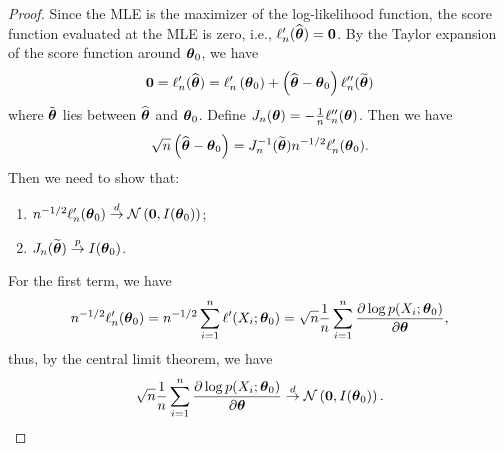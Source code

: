 \begin{proof}
	Since the MLE is the maximizer of the log-likelihood function, the score function evaluated at the MLE is zero, i.e., \(\ell_{n}^{\prime}(\widehat{\boldsymbol{\theta}})=\mathbf{0}\). By the Taylor expansion of the score function around \(\boldsymbol{\theta}_{0}\), we have
	\begin{equation*}
		\mathbf{0}=\ell_{n}^{\prime}(\widehat{\boldsymbol{\theta}})=\ell_{n}^{\prime}\left(\boldsymbol{\theta}_{0}\right)+\left(\widehat{\boldsymbol{\theta}}-\boldsymbol{\theta}_{0}\right)\ell_{n}^{\prime\prime}(\widetilde{\boldsymbol{\theta}})
	\end{equation*}
	where \(\tilde{\boldsymbol{\theta}}\) lies between \(\widehat{\boldsymbol{\theta}}\) and \(\boldsymbol{\theta}_{0}\). Define \(J_{n}(\boldsymbol{\theta})=-\frac{1}{n}\ell_{n}^{\prime\prime}(\boldsymbol{\theta})\). Then we have
	\begin{equation*}
		\sqrt{n}\left(\widehat{\boldsymbol{\theta}}-\boldsymbol{\theta}_{0}\right)=J_{n}^{-1}(\widetilde{\boldsymbol{\theta}})n^{-1/2}\ell_{n}^{\prime}(\boldsymbol{\theta}_{0}).
	\end{equation*}
	Then we need to show that:
	\begin{enumerate}
		\item \(n^{-1/2}\ell_{n}^{\prime}(\boldsymbol{\theta}_{0})\stackrel{d}{\rightarrow}\mathcal{N}\left(\mathbf{0}, I(\boldsymbol{\theta}_{0})\right)\);
		\item \(J_{n}(\widetilde{\boldsymbol{\theta}})\stackrel{p}{\rightarrow}I(\boldsymbol{\theta}_{0})\).
	\end{enumerate}

	For the first term, we have
	\begin{equation*}
		n^{-1/2}\ell_{n}^{\prime}(\boldsymbol{\theta}_{0})=n^{-1/2}\sum_{i=1}^{n}\ell^{\prime}(X_{i};\boldsymbol{\theta}_{0})=\sqrt{n}\frac{1}{n}\sum_{i=1}^{n}\frac{\partial\log p(X_{i};\boldsymbol{\theta}_{0})}{\partial\boldsymbol{\theta}},
	\end{equation*}
	thus, by the central limit theorem, we have
	\begin{equation*}
		\sqrt{n}\frac{1}{n}\sum_{i=1}^{n}\frac{\partial\log p(X_{i};\boldsymbol{\theta}_{0})}{\partial\boldsymbol{\theta}}\stackrel{d}{\rightarrow}\mathcal{N}\left(\mathbf{0},I(\boldsymbol{\theta}_{0})\right).
	\end{equation*}


\end{proof}
